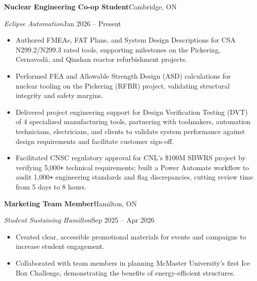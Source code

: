 \documentclass[a4paper]{article}
\begin{document}
\textbf{Nuclear Engineering Co-op Student}\hfill Cambridge, ON \par
\textit{Eclipse Automation}\hfill Jan 2026 -- Present
\vspace{1mm}
\begin{itemize}
    \item Authored FMEAs, FAT Plans, and System Design Descriptions for CSA N299.2/N299.3 rated tools, supporting milestones on the Pickering, Cernavodă, and Qinshan reactor refurbishment projects.
    \item Performed FEA and Allowable Strength Design (ASD) calculations for nuclear tooling on the Pickering (RFBR) project, validating structural integrity and safety margins.

    \item Delivered project engineering support for Design Verification Testing (DVT) of 4 specialized manufacturing tools, partnering with toolmakers, automation technicians, electricians, and clients to validate system performance against design requirements and facilitate customer sign-off.
    \item Facilitated CNSC regulatory approval for CNL's \$100M SBWRS project by verifying 5,000\texttt{+} technical requirements; built a Power Automate workflow to audit 1,000\texttt{+} engineering standards and flag discrepancies, cutting review time from 5 days to 8 hours.

\end{itemize}

\vspace{1.5mm}

\iffalse
\textbf{Marketing Team Member}\hfill Hamilton, ON \par
\textit{Student Sustaining Hamilton}\hfill Sep 2025 -- Apr 2026
\vspace{1mm}
\begin{itemize}
    \item Created clear, accessible promotional materials for events and campaigns to increase student engagement.
    \item Collaborated with team members in planning McMaster University's first Ice Box Challenge, demonstrating the benefits of energy-efficient structures.
\end{itemize}
\end{document}
